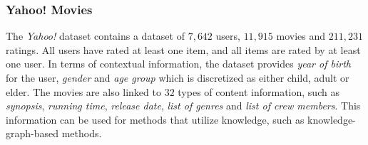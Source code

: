 \subsubsection{Yahoo! Movies}
The \textit{Yahoo!} dataset contains a dataset of $7,642$ users, $11,915$ movies and $211,231$ ratings.
All users have rated at least one item, and all items are rated by at least one user.
In terms of contextual information, the dataset provides \textit{year of birth} for the user, \textit{gender} and \textit{age group} which is discretized as either child, adult or elder.
The movies are also linked to $32$ types of content information, such as \textit{synopsis}, \textit{running time}, \textit{release date}, \textit{list of genres} and \textit{list of crew members}.
This information can be used for methods that utilize knowledge, such as knowledge-graph-based methods.

